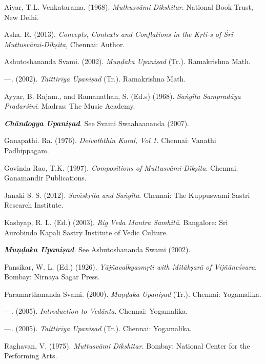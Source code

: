 \begin{thebibliography}{99}
\itemsep=1pt

  Aiyar, T.L. Venkatarama. (1968). \textit{Muthusvāmi Dikshitar}. National Book Trust, New Delhi.

  Asha. R. (2013). \textit{Concepts, Contexts and Conflations in the Kṛti-s of Śrī Muttusvāmi-Dīkṣita}, Chennai: Author.

  Ashutoshananda Svami. (2002). \textit{Muṇḍaka Upaniṣad} (Tr.). Ramakrishna Math.

  —. (2002). \textit{Taittirīya Upaniṣad} (Tr.). Ramakrishna Math.
 
  Ayyar, B. Rajam., and Ramanathan, S. (Ed.s) (1968). \textit{Saṅgīta Sampradāya Pradarśini}. Madras: The Music Academy.

  \textbf{\textit{Chāndogya Upaniṣad}}. See Svami Swaahaananda (2007).

  Ganapathi. Ra. (1976). \textit{Deivaththin Kural, Vol 1.} Chennai: Vanathi Padhippagam.

  Govinda Rao, T.K. (1997). \textit{Compositions of Muttusvāmi-Dīkṣita}. Chennai: Ganamandir Publications.

  Janaki S. S. (2012). \textit{Saṁskṛita and Saṅgīta}. Chennai: The Kuppuswami Sastri Research Institute.

  Kashyap, R. L. (Ed.) (2003). \textit{Rig Veda Mantra Samhitā}. Bangalore: Sri Aurobindo Kapali Sastry Institute of Vedic Culture.

  \textbf{\textit{Muṇḍaka Upaniṣad}}. See Ashutoshananda Swami (2002).

  Pansikar, W. L. (Ed.) (1926). \textit{Yājñavalkyasmṛti with Mitākṣarā of Vijñāneśvara}. Bombay: Nirnaya Sagar Press.

  Paramarthananda Svami. (2000). \textit{Muṇḍaka Upaniṣad} (Tr.). Chennai: Yogamalika.

  —. (2005). \textit{Introduction to Vedānta}. Chennai: Yogamalika.

  —. (2005). \textit{Taittirīya Upaniṣad} (Tr.). Chennai: Yogamalika.

  Raghavan, V. (1975). \textit{Muttusvāmi Dikshitar.} Bombay: National Center for the Performing Arts.


\end{thebibliography}
